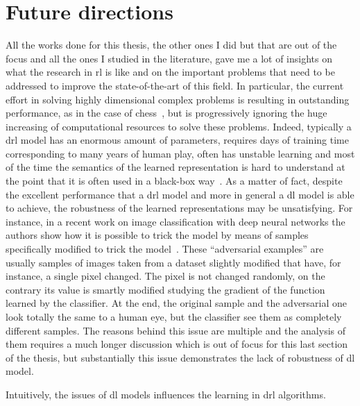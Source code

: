 \section{Future directions}
All the works done for this thesis, the other ones I did but that are out of the focus and all the ones I studied in the literature, gave me a lot of insights on what the research in \gls{rl} is like and on the important problems that need to be addressed to improve the state-of-the-art of this field. In particular, the current effort in solving highly dimensional complex problems is resulting in outstanding performance, as in the case of chess~\cite{silver2017chess}, but is progressively ignoring the huge increasing of computational resources to solve these problems. Indeed, typically a \gls{drl} model has an enormous amount of parameters, requires days of training time corresponding to many years of human play, often has unstable learning and most of the time the semantics of the learned representation is hard to understand at the point that it is often used in a black-box way~\cite{mnih2015human}. As a matter of fact, despite the excellent performance that a \gls{drl} model and more in general a \gls{dl} model is able to achieve, the robustness of the learned representations may be unsatisfying. For instance, in a recent work on image classification with deep neural networks the authors show how it is possible to trick the model by means of samples specifically modified to trick the model~\cite{yuan2017adversarial}. These ``adversarial examples'' are usually samples of images taken from a dataset slightly modified that have, for instance, a single pixel changed. The pixel is not changed randomly, on the contrary its value is smartly modified studying the gradient of the function learned by the classifier. At the end, the original sample and the adversarial one look totally the same to a human eye, but the classifier see them as completely different samples. The reasons behind this issue are multiple and the analysis of them requires a much longer discussion which is out of focus for this last section of the thesis, but substantially this issue demonstrates the lack of robustness of \gls{dl} model.

Intuitively, the issues of \gls{dl} models influences the learning in \gls{drl} algorithms.
